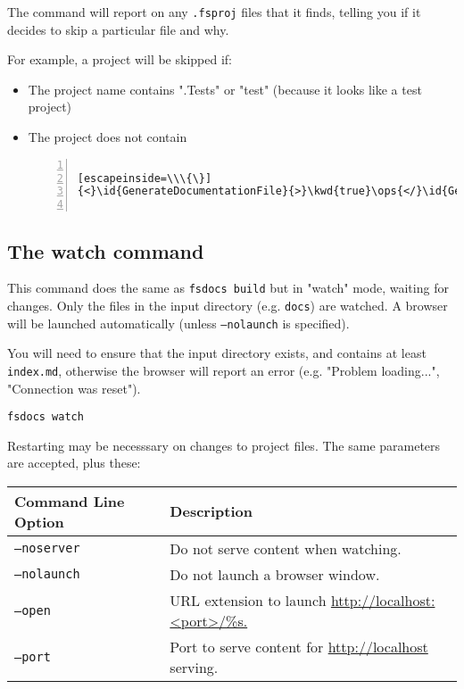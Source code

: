 \documentclass{article}
\newcommand{\id}[1]{\textcolor{black}{#1}}
\newcommand{\kwd}[1]{\textcolor{navy}{#1}}
\newcommand{\ops}[1]{\textcolor{purple}{#1}}
\begin{document}
The command will report on any \texttt{.fsproj} files that it finds, telling you if it decides to skip a particular file and why.


For example, a project will be skipped if:
\begin{itemize}
\item 

The project name contains ".Tests" or "test" (because it looks like a test project)

\item 

The project does not contain
\begin{lstlisting}[numbers=left]

[escapeinside=\\\{\}]
{<}\id{GenerateDocumentationFile}{>}\kwd{true}\ops{</}\id{GenerateDocumentationFile}{>}


\end{lstlisting}


\end{itemize}

\subsection*{The watch command}



This command does the same as \texttt{fsdocs build} but in "watch" mode, waiting for changes. Only the files in the input
directory (e.g. \texttt{docs}) are watched. A browser will be launched automatically (unless \texttt{--nolaunch} is specified).


You will need to ensure that the input directory exists, and contains at least \texttt{index.md}, otherwise the browser will
report an error (e.g. "Problem loading...", "Connection was reset").
\begin{lstlisting}
fsdocs watch

\end{lstlisting}


Restarting may be necesssary on changes to project files. The same parameters are accepted, plus these:
\begin{tabular}{|l|l|}\hline
\textbf{Command Line Option} & \textbf{Description}\\ \hline\hline
\texttt{--noserver} & Do not serve content when watching.\\ \hline
\texttt{--nolaunch} & Do not launch a browser window.\\ \hline
\texttt{--open} & URL extension to launch \href{http://localhost:<port>/\%s.}{http://localhost:<port>/\%s.}\\ \hline
\texttt{--port} & Port to serve content for \href{http://localhost}{http://localhost} serving.\\ \hline
\end{tabular}
\end{document}
